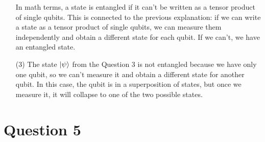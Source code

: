 \documentclass[12pt]{article}
\begin{document}
\begin{itemize}
In math terms, a state is entangled if it can't be written as a tensor product 
of single qubits. This is connected to the previous explanation: if we can write
a state as a tensor product of single qubits, we can measure them independently
and obtain a different state for each qubit. If we can't, we have an entangled state.

\item[(3)]
The state $\ket \psi$ from the Question 3 is not entangled because we have
only one qubit, so we can't measure it and obtain a different state for another
qubit. In this case, the qubit is in a superposition of states, but once we measure
it, it will collapse to one of the two possible states.

\end{itemize}
\section*{Question 5}
\end{document}
